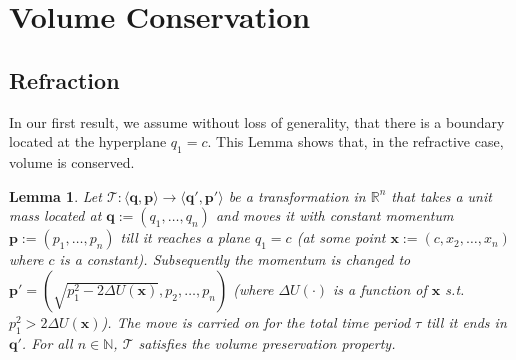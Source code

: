 \documentclass{article} %
\newtheorem{lemma}{Lemma}
\newcommand{\tuple}[1] {\langle #1 \rangle}
\newcommand{\bvec}[1]{\textbf{#1}}
\begin{document}
\section{Volume Conservation}


\subsection{Refraction}

In our first result, we assume without loss of generality, that there is a boundary located at the hyperplane $q_1=c$.  This Lemma shows that, in the refractive case, volume is conserved.

\begin{lemma} 
\label{lemma1}
Let $\mathcal{T}: \tuple{\bvec{q}, \bvec{p}} \rightarrow \tuple{\bvec{q}', \bvec{p}'}$ be a transformation in $\mathbb{R}^n$
that takes a unit mass located at $\bvec{q} := (q_1, \ldots, q_n)$ and moves it with constant momentum $\bvec{p} := (p_1, \ldots, p_n)$ till it reaches a plane $q_1 = c$ (at some point $\bvec{x} := (c, x_2, \ldots, x_n)$ where 
$c$ is a constant).
Subsequently the momentum is changed to 
$
\bvec{p}' = \left(\sqrt{p_1^2 - 2 \Delta U(\bvec{x})}, p_2, \ldots, p_n \right)
$
(where $\Delta U(\cdot)$ is a function of $\bvec{x}$ s.t.\ $p_1^2 > 2 \Delta U(\bvec{x})$).
The move is carried on for the total time period $\tau$ till it ends in $\bvec{q}'$. 
For all $n \in \mathbb{N}$, $\mathcal{T}$ satisfies the volume preservation property.
\end{lemma}
\end{document}
